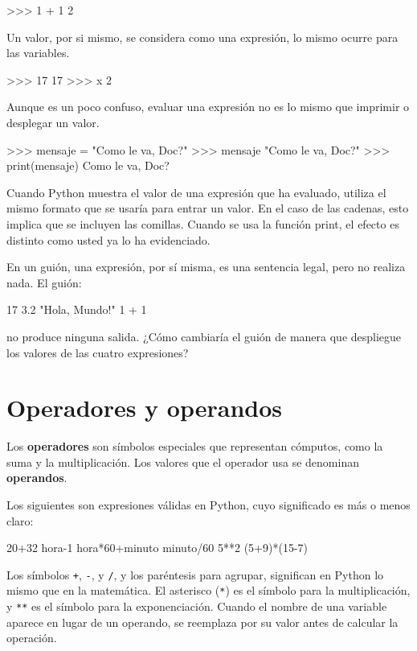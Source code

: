 \begin{pyconcode}
>>> 1 + 1
2
\end{pyconcode}


Un valor, por si mismo, se considera como una expresión, lo mismo
ocurre para las variables.

\begin{pyconcode}
>>> 17
17
>>> x
2
\end{pyconcode}


Aunque es un poco confuso, evaluar una expresión no es lo mismo que
imprimir o desplegar un valor.

\begin{pyconcode}
>>> mensaje = "Como le va, Doc?"
>>> mensaje
"Como le va, Doc?"
>>> print(mensaje)
Como le va, Doc?
\end{pyconcode}


Cuando Python muestra el valor de una expresión que ha evaluado, utiliza
el mismo formato que se usaría para entrar un valor. En el caso de
las cadenas, esto implica que se incluyen las comillas. Cuando se
usa la función print, el efecto es distinto como usted ya lo ha evidenciado.

En un guión, una expresión, por sí misma, es una sentencia legal,
pero no realiza nada. El guión:

\begin{pythoncode}
17
3.2
"Hola, Mundo!"
1 + 1
\end{pythoncode}


no produce ninguna salida. ¿Cómo cambiaría el guión de manera que
despliegue los valores de las cuatro expresiones?

\section{Operadores y operandos}

  

Los \textbf{operadores} son símbolos especiales que representan cómputos,
como la suma y la multiplicación. Los valores que el operador usa
se denominan \textbf{operandos}.

Los siguientes son expresiones válidas en Python, cuyo significado
es más o menos claro: 

\begin{pyconcode}
20+32       hora-1   hora*60+minuto   
minuto/60   5**2     (5+9)*(15-7)
\end{pyconcode}

Los símbolos \texttt{+}, \texttt{-}, y \texttt{/}, y los paréntesis
para agrupar, significan en Python lo mismo que en la matemática.
El asterisco (\texttt{{*}}) es el símbolo para la multiplicación,
y \texttt{{*}{*}} es el símbolo para la exponenciación. Cuando el
nombre de una variable aparece en lugar de un operando, se reemplaza
por su valor antes de calcular la operación.

